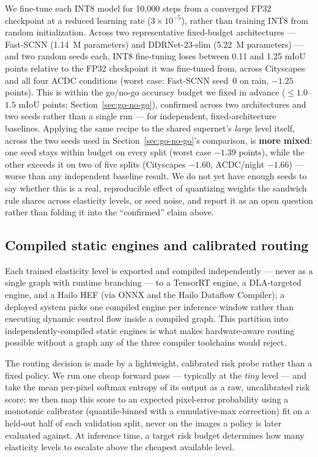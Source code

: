 \documentclass[a4paper,review,12pt]{elsarticle}
\begin{document}
We fine-tune each INT8 model for 10{,}000 steps from a converged FP32
checkpoint at a reduced learning rate ($3\times10^{-5}$), rather than training
INT8 from random initialization. Across two representative fixed-budget
architectures --- Fast-SCNN (1.14~M parameters) and DDRNet-23-slim (5.22~M
parameters) --- and two random seeds each, INT8 fine-tuning loses between 0.11
and 1.25 mIoU points relative to the FP32 checkpoint it was fine-tuned from,
across Cityscapes and all four ACDC conditions (worst case: Fast-SCNN seed~0
on rain, $-1.25$ points). This is within the go/no-go accuracy budget we fixed
in advance ($\leq 1.0$--$1.5$ mIoU points; Section~\ref{sec:go-no-go}),
confirmed across two architectures and two seeds rather than a single run ---
for independent, fixed-architecture baselines. Applying the same recipe to the
shared supernet's \emph{large} level itself, across the two seeds used in
Section~\ref{sec:go-no-go}'s comparison, is \textbf{more mixed}: one seed
stays within budget on every split (worst case $-1.39$ points), while the
other exceeds it on two of five splits (Cityscapes $-1.60$, ACDC/night
$-1.66$) --- worse than any independent baseline result. We do not yet have
enough seeds to say whether this is a real, reproducible effect of quantizing
weights the sandwich rule shares across elasticity levels, or seed noise, and
report it as an open question rather than folding it into the ``confirmed''
claim above.

\subsection{Compiled static engines and calibrated routing}
\label{sec:router}

Each trained elasticity level is exported and compiled independently ---
never as a single graph with runtime branching --- to a TensorRT engine, a
DLA-targeted engine, and a Hailo HEF (via ONNX and the Hailo Dataflow
Compiler); a deployed system picks one compiled engine per inference window
rather than executing dynamic control flow inside a compiled graph. This
partition into independently-compiled static engines is what makes
hardware-aware routing possible without a graph any of the three compiler
toolchains would reject.

The routing decision is made by a lightweight, calibrated risk probe rather
than a fixed policy. We run one cheap forward pass --- typically at the
\emph{tiny} level --- and take the mean per-pixel softmax entropy of its
output as a raw, uncalibrated risk score; we then map this score to an
expected pixel-error probability using a monotonic calibrator
(quantile-binned with a cumulative-max correction) fit on a held-out half of
each validation split, never on the images a policy is later evaluated
against. At inference time, a target risk budget determines how many
elasticity levels to escalate above the cheapest available level.
\end{document}
